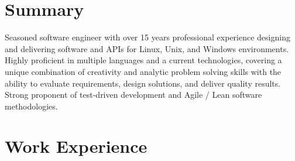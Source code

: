 \documentclass[11pt,letterpaper,roman]{moderncv} %
\begin{document}
\makeletterclosing %

\newpage


\makecvtitle %


\section{Summary}

	\cvitem{}
	{
		Seasoned software engineer with over 15 years professional experience designing and delivering software and APIs for Linux, Unix, and Windows environments.  Highly proficient in multiple languages and a current technologies, covering a unique combination of creativity and analytic problem solving skills with the ability to evaluate requirements, design solutions, and deliver quality results.  Strong proponent of test-driven development and Agile / Lean software methodologies.
	}


\section{Work Experience}
\end{document}

